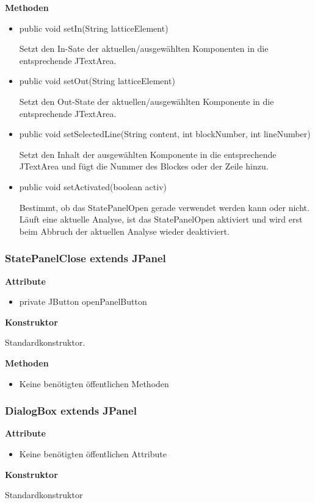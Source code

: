 \textbf{Methoden}
\begin{itemize}
	\item public void setIn(String latticeElement)\par
		Setzt den In-Sate der aktuellen/ausgewählten Komponenten in die entsprechende JTextArea.
	\item public void setOut(String latticeElement)\par
		Setzt den Out-State der aktuellen/ausgewählten Komponente in die entsprechende JTextArea.
	\item public void setSelectedLine(String content, int blockNumber, int lineNumber)\par
		Setzt den Inhalt der ausgewählten Komponente in die entsprechende JTextArea und fügt die Nummer des Blockes oder der Zeile hinzu.
	\item public void setActivated(boolean activ)\par
		Bestimmt, ob das StatePanelOpen gerade verwendet werden kann oder nicht. Läuft eine aktuelle	Analyse, ist das StatePanelOpen aktiviert und wird erst beim Abbruch der aktuellen Analyse wieder deaktiviert.
\end{itemize}

\subsubsection{StatePanelClose extends JPanel}
\textbf{Attribute}
\begin{itemize}
	\item private JButton openPanelButton
\end{itemize}

\textbf{Konstruktor}\par
Standardkonstruktor.

\textbf{Methoden}
\begin{itemize}
	\item Keine benötigten öffentlichen Methoden
\end{itemize}

\subsubsection{DialogBox extends JPanel}
\textbf{Attribute}
\begin{itemize}
 	\item Keine benötigten öffentlichen Attribute
\end{itemize}

\textbf{Konstruktor}\par
Standardkonstruktor

